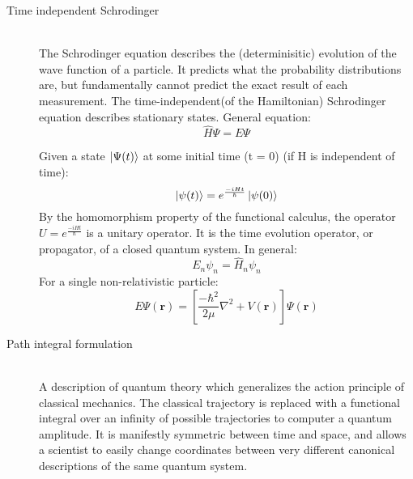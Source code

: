 \documentclass[12pt,letterpaper,oneside,final,titlepage]{article}               %
\numberwithin{equation}{section} %
\renewcommand{\vec}[1]{\mathbf{#1}}
\begin{document}
\begin{description}
    \item[Time independent Schrodinger] \hfill \\
    The Schrodinger equation describes the (determinisitic) evolution of the wave function of a particle.
    It predicts what the probability distributions are, but fundamentally cannot predict the exact result of each measurement.
    The time-independent(of the Hamiltonian) Schrodinger equation describes stationary states.
    General equation:
    \begin{equation}
        \hat{H}\Psi = E\Psi
    \end{equation}

    Given a state $\ket{\Psi(t)}$ at some initial time (t = 0) (if H is independent of time):
    \begin{equation}
        \ket{\psi(t)} = e^{\frac{-iHt}{\hbar}}\ket{\psi(0)}
    \end{equation}
    By the homomorphism property of the functional calculus, the operator $U = e^{\frac{-iHt}{\hbar}}$ is a unitary operator.
    It is the time evolution operator, or propagator, of a closed quantum system. 
    In general:
    \begin{equation}
        E_{n}\psi_{n} = \hat{H}_{n}\psi_{n}
    \end{equation}
    For a single non-relativistic particle:
    \begin{equation}
        E\Psi(\vec{r}) = \left[\frac{-\hbar^{2}}{2\mu}\nabla^{2} + V(\vec{r})\right]\Psi(\vec{r})
    \end{equation}

    \item[Path integral formulation] \hfill \\
    A description of quantum theory which generalizes the action principle of classical mechanics.
    The classical trajectory is replaced with a functional integral over an infinity of possible trajectories to computer a quantum amplitude.
    It is manifestly symmetric between time and space, and allows a scientist to easily change coordinates between very different canonical descriptions of the same quantum system.    
\end{description} 
\end{document}
